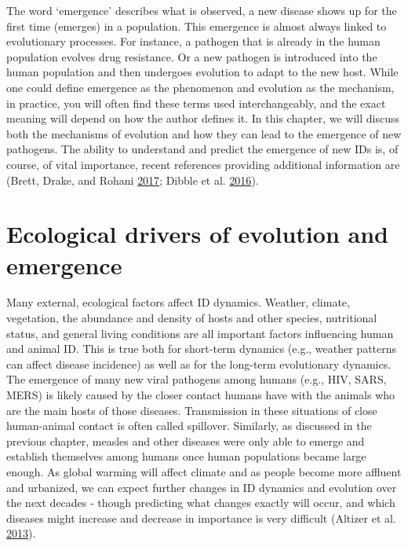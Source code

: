 \documentclass[
]{book}
\begin{document}
The word `emergence' describes what is observed, a new disease shows up for the first time (emerges) in a population. This emergence is almost always linked to evolutionary processes. For instance, a pathogen that is already in the human population evolves drug resistance. Or a new pathogen is introduced into the human population and then undergoes evolution to adapt to the new host. While one could define emergence as the phenomenon and evolution as the mechanism, in practice, you will often find these terms used interchangeably, and the exact meaning will depend on how the author defines it. In this chapter, we will discuss both the mechanisms of evolution and how they can lead to the emergence of new pathogens. The ability to understand and predict the emergence of new IDs is, of course, of vital importance, recent references providing additional information are (Brett, Drake, and Rohani \protect\hyperlink{ref-brett17}{2017}; Dibble et al. \protect\hyperlink{ref-dibble16}{2016}).

\hypertarget{ecological-drivers-of-evolution-and-emergence}{%
\section{Ecological drivers of evolution and emergence}\label{ecological-drivers-of-evolution-and-emergence}}

Many external, ecological factors affect ID dynamics. Weather, climate, vegetation, the abundance and density of hosts and other species, nutritional status, and general living conditions are all important factors influencing human and animal ID. This is true both for short-term dynamics (e.g., weather patterns can affect disease incidence) as well as for the long-term evolutionary dynamics. The emergence of many new viral pathogens among humans (e.g., HIV, SARS, MERS) is likely caused by the closer contact humans have with the animals who are the main hosts of those diseases. Transmission in these situations of close human-animal contact is often called spillover. Similarly, as discussed in the previous chapter, measles and other diseases were only able to emerge and establish themselves among humans once human populations became large enough. As global warming will affect climate and as people become more affluent and urbanized, we can expect further changes in ID dynamics and evolution over the next decades - though predicting what changes exactly will occur, and which diseases might increase and decrease in importance is very difficult (Altizer et al. \protect\hyperlink{ref-altizer13}{2013}).
\end{document}
